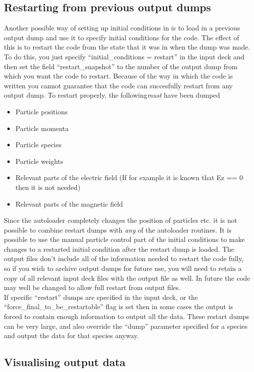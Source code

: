 \documentclass[12pt,a4paper]{article}
\newcommand{\EPOCH}{{\color{warwickdark}\fontfamily{phv}\selectfont{EPOCH}}}
\begin{document}
\subsection{Restarting {\EPOCH} from previous output dumps}
Another possible way of setting up initial conditions in {\EPOCH} is to load in
a previous output dump and use it to specify initial conditions for the
code. The effect of this is to restart the code from the state that it was in
when the dump was made. To do this, you just specify ``initial\_conditions =
restart'' in the input deck and then set the field ``restart\_snapshot'' to
the number of the output dump from which you want the code to restart. Because
of the way in which the code is written you cannot guarantee that the code can
succesfully restart from any output dump. To restart properly, the
following{\it must} have been dumped
\begin{itemize}
\item Particle positions
\item Particle momenta
\item Particle species
\item Particle weights
\item Relevant parts of the electric field (If for example it is known that Ez
  == 0 then it is not needed)
\item Relevant parts of the magnetic field
\end{itemize}
Since the autoloader completely changes the position of particles etc. it is
not possible to combine restart dumps with {\it any} of the autoloader
routines. It is possible to use the manual particle control part of the
initial conditions to make changes to a restarted initial condition after the
restart dump is loaded. The output files don't include all of the information
needed to restart the code fully, so if you wish to archive output dumps for
future use, you will need to retain a copy of all relevant input deck files
with the output file as well. In future the code may well be changed to allow
full restart from output files.\\

If specific ``restart'' dumps are specified in the input deck, or the
``force\_final\_to\_be\_restartable'' flag is set then in some cases the
output is forced to contain enough information to output all the data. These
restart dumps can be very large, and also override the ``dump'' parameter
specified for a species and output the data for that species anyway.

\subsection{Visualising {\EPOCH} output data}
\end{document}
